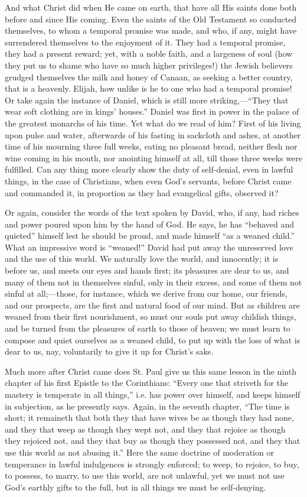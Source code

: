 And what Christ did when He came on earth, that have all His saints
done both before and since His coming. Even the saints of the Old
Testament so conducted themselves, to whom a temporal promise was
made, and who, if any, might have surrendered themselves to the
enjoyment of it. They had a temporal promise, they had a present
reward; yet, with a noble faith, and a largeness of soul (how they put
us to shame who have so much higher privileges!) the Jewish believers
grudged themselves the milk and honey of Canaan, as seeking a better
country, that is a heavenly. Elijah, how unlike is he to one who had a
temporal promise! Or take again the instance of Daniel, which is still
more striking,—``They that wear soft clothing are in kings'
houses.'' Daniel was first in power in the palace of the greatest
monarchs of his time. Yet what do we read of him? First of his living
upon pulse and water, afterwards of his fasting in sackcloth and
ashes, at another time of his mourning three full weeks, eating no
pleasant bread, neither flesh nor wine coming in his mouth, nor
anointing himself at all, till those three weeks were fulfilled. Can
any thing more clearly show the duty of self-denial, even in lawful
things, in the case of Christians, when even God's servants, before
Christ came and commanded it, in proportion as they had evangelical
gifts, observed it?

Or again, consider the words of the text spoken by David, who, if
any, had riches and power poured upon him by the hand of God. He says,
he has ``behaved and quieted'' himself lest he should be
proud, and made himself ``as a weaned child.'' What an
impressive word is ``weaned!'' David had put away the
unreserved love and the use of this world. We naturally love the
world, and innocently; it is before us, and meets our eyes and hands
first; its pleasures are dear to us, and many of them not in
themselves sinful, only in their excess, and some of them not sinful
at all;—those, for instance, which we derive from our home, our
friends, and our prospects, are the first and natural food of our
mind. But as children are weaned from their first nourishment, so must
our souls put away childish things, and be turned from the pleasures
of earth to those of heaven; we must learn to compose and quiet
ourselves as a weaned child, to put up with the loss of what is dear
to us, nay, voluntarily to give it up for Christ's sake.

Much more after Christ came does St. Paul give us this same lesson
in the ninth chapter of his first Epistle to the Corinthians:
``Every one that striveth for the mastery is temperate in all
things,'' i.e. has power over himself, and keeps himself in
subjection, as he presently says. Again, in the seventh chapter,
``The time is short; it remaineth that both they that have wives
be as though they had none, and they that weep as though they wept
not, and they that rejoice as though they rejoiced not, and they that
buy as though they possessed not, and they that use this world as not
abusing it.'' Here the same doctrine of moderation or temperance
in lawful indulgences is strongly enforced; to weep, to rejoice, to
buy, to possess, to marry, to use this world, are not unlawful, yet we
must not use God's earthly gifts to the full, but in all things we
must be self-denying.

